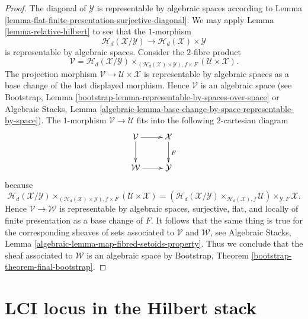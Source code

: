 \documentclass{stacks-project}
\theoremstyle{plain}
\theoremstyle{definition}
\theoremstyle{remark}
\numberwithin{equation}{subsection}
\begin{document}
\begin{proof}
\medskip\noindent
The diagonal of $\mathcal{Y}$ is representable by algebraic spaces according to
Lemma \ref{lemma-flat-finite-presentation-surjective-diagonal}.
We may apply
Lemma \ref{lemma-relative-hilbert}
to see that the $1$-morphism
$$
\mathcal{H}_d(\mathcal{X}/\mathcal{Y})
\longrightarrow
\mathcal{H}_d(\mathcal{X}) \times \mathcal{Y}
$$
is representable by algebraic spaces. Consider the $2$-fibre product
$$
\mathcal{V} =
\mathcal{H}_d(\mathcal{X}/\mathcal{Y})
\times_{(\mathcal{H}_d(\mathcal{X}) \times \mathcal{Y}), f \times F}
(\mathcal{U} \times \mathcal{X}).
$$
The projection morphism $\mathcal{V} \to \mathcal{U} \times \mathcal{X}$
is representable by algebraic spaces as a base change of the last
displayed morphism. Hence $\mathcal{V}$ is an algebraic space (see
Bootstrap, Lemma \ref{bootstrap-lemma-representable-by-spaces-over-space}
or
Algebraic Stacks,
Lemma \ref{algebraic-lemma-base-change-by-space-representable-by-space}).
The $1$-morphism $\mathcal{V} \to \mathcal{U}$ fits into the following
$2$-cartesian diagram
$$
\xymatrix{
\mathcal{V} \ar[d] \ar[r] & \mathcal{X} \ar[d]^F \\
\mathcal{W} \ar[r] & \mathcal{Y}
}
$$
because
$$
\mathcal{H}_d(\mathcal{X}/\mathcal{Y})
\times_{(\mathcal{H}_d(\mathcal{X}) \times \mathcal{Y}), f \times F}
(\mathcal{U} \times \mathcal{X})
=
(\mathcal{H}_d(\mathcal{X}/\mathcal{Y})
\times_{\mathcal{H}_d(\mathcal{X}), f}
\mathcal{U}) \times_{\mathcal{Y}, F} \mathcal{X}.
$$
Hence $\mathcal{V} \to \mathcal{W}$ is representable by algebraic spaces,
surjective, flat, and locally of finite presentation as a base change
of $F$. It follows that the same thing is true for the corresponding
sheaves of sets associated to $\mathcal{V}$ and $\mathcal{W}$, see
Algebraic Stacks, Lemma \ref{algebraic-lemma-map-fibred-setoids-property}.
Thus we conclude that the sheaf associated to $\mathcal{W}$ is an
algebraic space by
Bootstrap, Theorem \ref{bootstrap-theorem-final-bootstrap}.
\end{proof}




\section{LCI locus in the Hilbert stack}
\label{section-lci}
\end{document}
